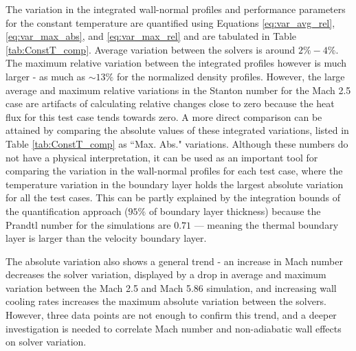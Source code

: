 \documentclass[journal ]{new-aiaa}
\begin{document}
The variation in the integrated wall-normal profiles and performance parameters for the constant temperature are quantified using Equations \eqref{eq:var_avg_rel}, \eqref{eq:var_max_abs}, and  \eqref{eq:var_max_rel} and are tabulated in Table \ref{tab:ConstT_comp}. Average variation between the solvers is around $2\% - 4\%$. The maximum relative variation between the integrated profiles however is much larger - as much as $\sim13\%$ for the normalized density profiles. However, the large average and maximum relative variations in the Stanton number for the Mach 2.5 case are artifacts of calculating relative changes close to zero because the heat flux for this test case tends towards zero. A more direct comparison can be attained by comparing the absolute values of these integrated variations, listed in Table \ref{tab:ConstT_comp} as ``Max. Abs." variations. Although these numbers do not have a physical interpretation, it can be used as an important tool for comparing the variation in the wall-normal profiles for each test case, where the temperature variation in the boundary layer holds the largest absolute variation for all the test cases. This can be partly explained by the integration bounds of the quantification approach ($95\%$ of boundary layer thickness) because the Prandtl number for the simulations are $0.71$ --- meaning the thermal boundary layer is larger than the velocity boundary layer. 

The absolute variation also shows a general trend - an increase in Mach number decreases the solver variation, displayed by a drop in average and maximum variation between the Mach 2.5 and Mach 5.86 simulation, and increasing wall cooling rates increases the maximum absolute variation between the solvers. However, three data points are not enough to confirm this trend, and a deeper investigation is needed to correlate Mach number and non-adiabatic wall effects on solver variation.
\end{document}
